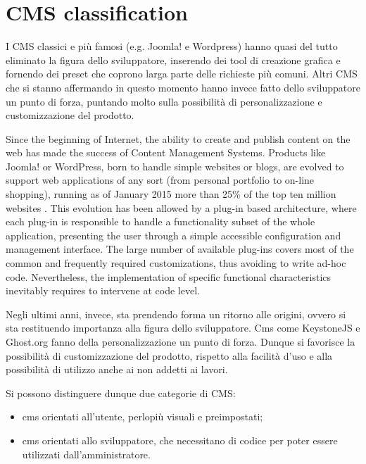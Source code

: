 \section{CMS classification}
\label{sec:CMS_class}

I CMS classici e più famosi (e.g. Joomla! e Wordpress) hanno quasi del tutto eliminato la figura dello sviluppatore, inserendo dei tool di creazione grafica e fornendo dei preset che coprono larga parte delle richieste più comuni. Altri CMS che si stanno affermando in questo momento hanno invece fatto dello sviluppatore un punto di forza, puntando molto sulla possibilità di personalizzazione e customizzazione del prodotto.

Since the beginning of Internet, the ability to create and publish content on the web has made the success of Content Management Systems. Products like Joomla! or WordPress, born to handle simple websites or blogs, are evolved to support web applications of any sort (from personal portfolio to on-line shopping), running as of January 2015 more than 25\% of the top ten million websites \cite{cms_stats}. This evolution has been allowed by a plug-in based architecture, where each plug-in is responsible to handle a functionality subset of the whole application, presenting the user through a simple accessible configuration and management interface.
The large number of available plug-ins covers most of the common and frequently required customizations, thus avoiding to write ad-hoc code. Nevertheless, the implementation of specific functional characteristics inevitably requires to intervene at code level.

Negli ultimi anni, invece, sta prendendo forma un ritorno alle origini, ovvero si sta restituendo importanza alla figura dello sviluppatore. Cms come KeystoneJS e Ghost.org fanno della personalizzazione un punto di forza.
Dunque si favorisce la possibilità di customizzazione del prodotto, rispetto alla facilità d'uso e alla possibilità di utilizzo anche ai non addetti ai lavori. 

Si possono distinguere dunque due categorie di CMS:
\begin{itemize}

\item cms orientati all'utente, perlopiù visuali e preimpostati;
\item cms orientati allo sviluppatore, che necessitano di codice per poter essere utilizzati dall'amministratore.

\end{itemize}